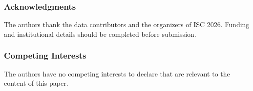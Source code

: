 \documentclass[runningheads]{llncs}
\begin{document}
\begin{credits}
\subsubsection{Acknowledgments} The authors thank the data contributors and the organizers of ISC 2026. Funding and institutional details should be completed before submission.

\subsubsection{Competing Interests} The authors have no competing interests to declare that are relevant to the content of this paper.
\end{credits}

\vspace{-0.22in}
\begingroup
\sloppy
\footnotesize
\end{document}
